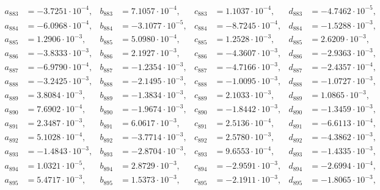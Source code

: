 \begin{align*}
  a_{ 883 } &= -3.7251 \cdot 10^{ -4 }, & b_{ 883 } &= 7.1057 \cdot 10^{ -4 }, & c_{ 883 } &= 1.1037 \cdot 10^{ -4 }, & d_{ 883 } &= -4.7462 \cdot 10^{ -5 }, \\ 
  a_{ 884 } &= -6.0968 \cdot 10^{ -4 }, & b_{ 884 } &= -3.1077 \cdot 10^{ -5 }, & c_{ 884 } &= -8.7245 \cdot 10^{ -4 }, & d_{ 884 } &= -1.5288 \cdot 10^{ -3 }, \\ 
  a_{ 885 } &= 1.2906 \cdot 10^{ -3 }, & b_{ 885 } &= 5.0980 \cdot 10^{ -4 }, & c_{ 885 } &= 1.2528 \cdot 10^{ -3 }, & d_{ 885 } &= 2.6209 \cdot 10^{ -3 }, \\ 
  a_{ 886 } &= -3.8333 \cdot 10^{ -3 }, & b_{ 886 } &= 2.1927 \cdot 10^{ -3 }, & c_{ 886 } &= -4.3607 \cdot 10^{ -3 }, & d_{ 886 } &= -2.9363 \cdot 10^{ -3 }, \\ 
  a_{ 887 } &= -6.9790 \cdot 10^{ -4 }, & b_{ 887 } &= -1.2354 \cdot 10^{ -3 }, & c_{ 887 } &= -4.7166 \cdot 10^{ -3 }, & d_{ 887 } &= -2.4357 \cdot 10^{ -4 }, \\ 
  a_{ 888 } &= -3.2425 \cdot 10^{ -3 }, & b_{ 888 } &= -2.1495 \cdot 10^{ -3 }, & c_{ 888 } &= -1.0095 \cdot 10^{ -3 }, & d_{ 888 } &= -1.0727 \cdot 10^{ -3 }, \\ 
  a_{ 889 } &= 3.8084 \cdot 10^{ -3 }, & b_{ 889 } &= -1.3834 \cdot 10^{ -3 }, & c_{ 889 } &= 2.1033 \cdot 10^{ -3 }, & d_{ 889 } &= 1.0865 \cdot 10^{ -3 }, \\ 
  a_{ 890 } &= 7.6902 \cdot 10^{ -4 }, & b_{ 890 } &= -1.9674 \cdot 10^{ -3 }, & c_{ 890 } &= -1.8442 \cdot 10^{ -3 }, & d_{ 890 } &= -1.3459 \cdot 10^{ -3 }, \\ 
  a_{ 891 } &= 2.3487 \cdot 10^{ -3 }, & b_{ 891 } &= 6.0617 \cdot 10^{ -3 }, & c_{ 891 } &= 2.5136 \cdot 10^{ -4 }, & d_{ 891 } &= -6.6113 \cdot 10^{ -4 }, \\ 
  a_{ 892 } &= 5.1028 \cdot 10^{ -4 }, & b_{ 892 } &= -3.7714 \cdot 10^{ -3 }, & c_{ 892 } &= 2.5780 \cdot 10^{ -3 }, & d_{ 892 } &= -4.3862 \cdot 10^{ -3 }, \\ 
  a_{ 893 } &= -1.4843 \cdot 10^{ -3 }, & b_{ 893 } &= -2.8704 \cdot 10^{ -3 }, & c_{ 893 } &= 9.6553 \cdot 10^{ -4 }, & d_{ 893 } &= -1.4335 \cdot 10^{ -3 }, \\ 
  a_{ 894 } &= 1.0321 \cdot 10^{ -5 }, & b_{ 894 } &= 2.8729 \cdot 10^{ -3 }, & c_{ 894 } &= -2.9591 \cdot 10^{ -3 }, & d_{ 894 } &= -2.6994 \cdot 10^{ -4 }, \\ 
  a_{ 895 } &= 5.4717 \cdot 10^{ -3 }, & b_{ 895 } &= 1.5373 \cdot 10^{ -3 }, & c_{ 895 } &= -2.1911 \cdot 10^{ -3 }, & d_{ 895 } &= -1.8065 \cdot 10^{ -3 }, \\ 

\end{align*}
